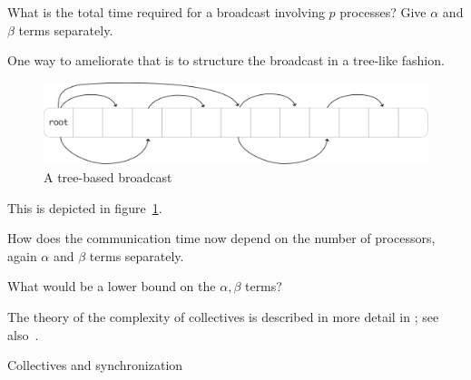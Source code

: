 \begin{exercise}
  \label{ex:latencylinear}
  What is the total time required for a broadcast involving $p$
  processes?
  Give $\alpha$ and $\beta$ terms separately.
\end{exercise}

One way to ameliorate that is to structure the
broadcast in a tree-like fashion.
\begin{figure}[ht]
  \includegraphics[scale=.1]{graphics/bcast-tree}
  \caption{A tree-based broadcast}
  \label{fig:bcast-tree}
\end{figure}
This is depicted in figure~\ref{fig:bcast-tree}.

\begin{exercise}
  \label{ex:latencylog}
  How does the
  communication time now depend on the number of processors, again
  $\alpha$ and $\beta$ terms separately.

  What would be a lower bound on the $\alpha,\beta$ terms?
\end{exercise}

The theory
of the complexity of collectives is described in more detail in
; see also~\cite{Chan2007Collective}.

 {Collectives and synchronization}

